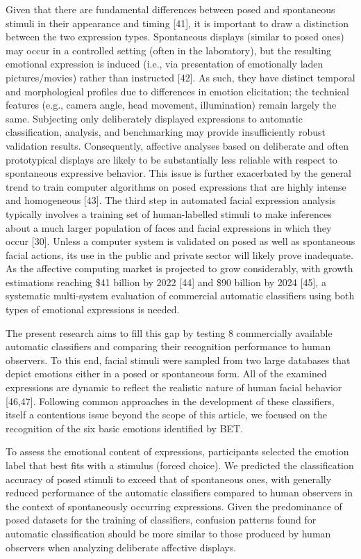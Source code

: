 \documentclass[10pt,letterpaper]{article}
\begin{document}
Given that there are fundamental differences between posed and spontaneous stimuli in their appearance and timing {[}41{]}, it is important to draw a distinction between the two expression types. Spontaneous displays (similar to posed ones) may occur in a controlled setting (often in the laboratory), but the resulting emotional expression is induced (i.e., via presentation of emotionally laden pictures/movies) rather than instructed {[}42{]}. As such, they have distinct temporal and morphological profiles due to differences in emotion elicitation; the technical features (e.g., camera angle, head movement, illumination) remain largely the same. Subjecting only deliberately displayed expressions to automatic classification, analysis, and benchmarking may provide insufficiently robust validation results. Consequently, affective analyses based on deliberate and often prototypical displays are likely to be substantially less reliable with respect to spontaneous expressive behavior. This issue is further exacerbated by the general trend to train computer algorithms on posed expressions that are highly intense and homogeneous {[}43{]}. The third step in automated facial expression analysis typically involves a training set of human-labelled stimuli to make inferences about a much larger population of faces and facial expressions in which they occur {[}30{]}. Unless a computer system is validated on posed as well as spontaneous facial actions, its use in the public and private sector will likely prove inadequate. As the affective computing market is projected to grow considerably, with growth estimations reaching \$41 billion by 2022 {[}44{]} and \$90 billion by 2024 {[}45{]}, a systematic multi-system evaluation of commercial automatic classifiers using both types of emotional expressions is needed.

The present research aims to fill this gap by testing 8 commercially available automatic classifiers and comparing their recognition performance to human observers. To this end, facial stimuli were sampled from two large databases that depict emotions either in a posed or spontaneous form. All of the examined expressions are dynamic to reflect the realistic nature of human facial behavior {[}46,47{]}. Following common approaches in the development of these classifiers, itself a contentious issue beyond the scope of this article, we focused on the recognition of the six basic emotions identified by BET.

To assess the emotional content of expressions, participants selected the emotion label that best fits with a stimulus (forced choice). We predicted the classification accuracy of posed stimuli to exceed that of spontaneous ones, with generally reduced performance of the automatic classifiers compared to human observers in the context of spontaneously occurring expressions. Given the predominance of posed datasets for the training of classifiers, confusion patterns found for automatic classification should be more similar to those produced by human observers when analyzing deliberate affective displays.
\end{document}
